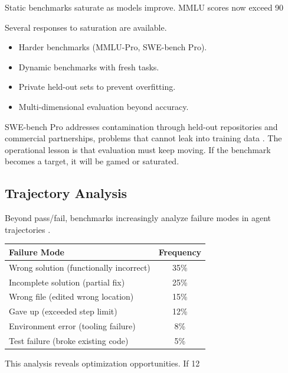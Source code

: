 Static benchmarks saturate as models improve. MMLU scores now exceed 90%

Several responses to saturation are available.
\begin{itemize}
\item Harder benchmarks (MMLU-Pro, SWE-bench Pro).
\item Dynamic benchmarks with fresh tasks.
\item Private held-out sets to prevent overfitting.
\item Multi-dimensional evaluation beyond accuracy.
\end{itemize}

SWE-bench Pro addresses contamination through held-out repositories and commercial partnerships, problems that cannot leak into training data \cite{swebenchpro2025}. The operational lesson is that evaluation must keep moving. If the benchmark becomes a target, it will be gamed or saturated.

\subsection{Trajectory Analysis}

Beyond pass/fail, benchmarks increasingly analyze failure modes in agent trajectories \cite{swebenchpro2025}.

\begin{center}
\begin{tabular}{lc}
\toprule
Failure Mode & Frequency \\
\midrule
Wrong solution (functionally incorrect) & 35\% \\
Incomplete solution (partial fix) & 25\% \\
Wrong file (edited wrong location) & 15\% \\
Gave up (exceeded step limit) & 12\% \\
Environment error (tooling failure) & 8\% \\
Test failure (broke existing code) & 5\% \\
\bottomrule
\end{tabular}
\end{center}

This analysis reveals optimization opportunities. If 12%

